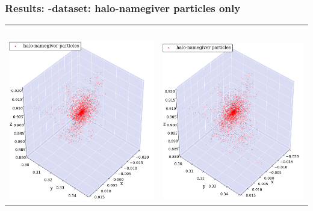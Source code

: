 \begin{frame}
	\frametitle{Results: \cosmo-dataset: halo-namegiver particles only}
	
	\begin{tabular}{c c}
		\phewon\ 	& \simple \\[1.5em]
		{\includegraphics[width = .49\textwidth]{../report/images/cosmo/cos-halo-66858-halo-only-phew.png}} \hspace*{-1em} 	& 
		{\includegraphics[width = .49\textwidth]{../report/images/cosmo/cos-halo-66858-halo-only-nosaddle.png}}
	\end{tabular}
\end{frame}